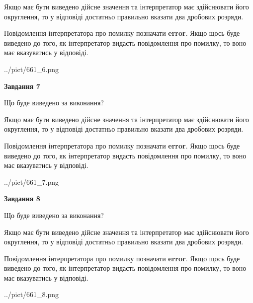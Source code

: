 \documentclass[12pt, ukrainian]{article}
\begin{document}
{\begin {Large}
Якщо має бути виведено дійсне значення та інтерпретатор має здійснювати його округлення, 
то у відповіді достатньо правильно вказати два дробових розряди.

Повідомлення інтерпретатора про помилку позначати \textbf{error}.
Якщо щось буде виведено до того, як інтерпретатор видасть повідомлення про помилку, 
то воно має вказуватись у відповіді. \par

\begin{center}
	{../pict/661_6.png}
\end{center}
\newpage

{\begin {center}\textbf{Завдання 7}\end {center}}\par
Що буде виведено за виконання? \par

Якщо має бути виведено дійсне значення та інтерпретатор має здійснювати його округлення, 
то у відповіді достатньо правильно вказати два дробових розряди.

Повідомлення інтерпретатора про помилку позначати \textbf{error}.
Якщо щось буде виведено до того, як інтерпретатор видасть повідомлення про помилку, 
то воно має вказуватись у відповіді. \par

\begin{center}
	{../pict/661_7.png}
\end{center}
\newpage

{\begin {center}\textbf{Завдання 8}\end {center}}\par
Що буде виведено за виконання? \par

Якщо має бути виведено дійсне значення та інтерпретатор має здійснювати його округлення, 
то у відповіді достатньо правильно вказати два дробових розряди.

Повідомлення інтерпретатора про помилку позначати \textbf{error}.
Якщо щось буде виведено до того, як інтерпретатор видасть повідомлення про помилку, 
то воно має вказуватись у відповіді. \par

\begin{center}
	{../pict/661_8.png}
\end{center}
\newpage


\end{Large}}
\end{document}
